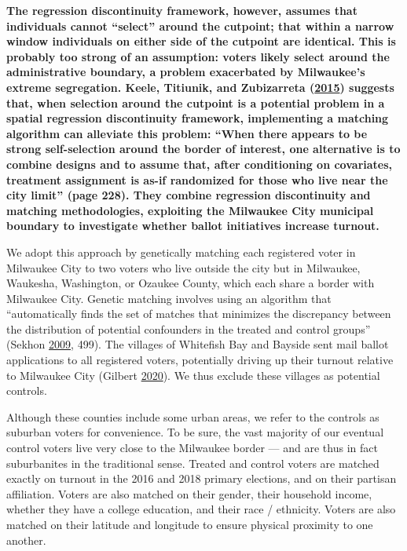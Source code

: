 \documentclass[
  12pt,
]{article}
\begin{document}
\textbf{The regression discontinuity framework, however, assumes that individuals cannot ``select'' around the cutpoint; that within a narrow window individuals on either side of the cutpoint are identical. This is probably too strong of an assumption: voters likely select around the administrative boundary, a problem exacerbated by Milwaukee's extreme segregation. Keele, Titiunik, and Zubizarreta (\protect\hyperlink{ref-Keele2015}{2015}) suggests that, when selection around the cutpoint is a potential problem in a spatial regression discontinuity framework, implementing a matching algorithm can alleviate this problem: ``When there appears to be strong self-selection around the border of interest, one alternative is to combine designs and to assume that, after conditioning on covariates, treatment assignment is as-if randomized for those who live near the city limit'' (page 228). They combine regression discontinuity and matching methodologies, exploiting the Milwaukee City municipal boundary to investigate whether ballot initiatives increase turnout.}

We adopt this approach by genetically matching each registered voter in Milwaukee City to two voters who live outside the city but in Milwaukee, Waukesha, Washington, or Ozaukee County, which each share a border with Milwaukee City. Genetic matching involves using an algorithm that ``automatically finds the set of matches that minimizes the discrepancy between the distribution of potential confounders in the treated and control groups'' (Sekhon \protect\hyperlink{ref-Sekhon2009}{2009}, 499). The villages of Whitefish Bay and Bayside sent mail ballot applications to all registered voters, potentially driving up their turnout relative to Milwaukee City (Gilbert \protect\hyperlink{ref-Gilbert2020}{2020}). We thus exclude these villages as potential controls.

Although these counties include some urban areas, we refer to the controls as suburban voters for convenience. To be sure, the vast majority of our eventual control voters live very close to the Milwaukee border --- and are thus in fact suburbanites in the traditional sense. Treated and control voters are matched exactly on turnout in the 2016 and 2018 primary elections, and on their partisan affiliation. Voters are also matched on their gender, their household income, whether they have a college education, and their race / ethnicity. Voters are also matched on their latitude and longitude to ensure physical proximity to one another.
\end{document}
